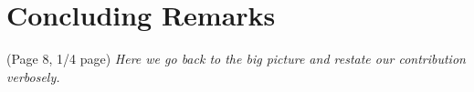 \section{Concluding Remarks} (Page 8, 1/4 page)
{ \it Here we go back to the big picture and restate our contribution verbosely.  }

% 
% 
%     
% 
% 
